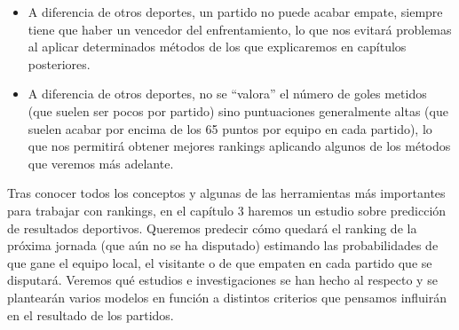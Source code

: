 \begin{itemize}
	\item A diferencia de otros deportes, un partido no puede acabar empate, siempre tiene que haber un vencedor del enfrentamiento, lo que nos evitará problemas al aplicar determinados métodos de los que explicaremos en capítulos posteriores. 
	\item A diferencia de otros deportes, no se ``valora'' el número de goles metidos (que suelen ser pocos por partido) sino puntuaciones generalmente altas (que suelen acabar por encima de los 65 puntos por equipo en cada partido), lo que nos permitirá obtener mejores rankings aplicando algunos de los métodos que veremos más adelante. 
\end{itemize}

Tras conocer todos los conceptos y algunas de las herramientas más importantes para trabajar con rankings, en el capítulo 3 haremos un estudio sobre predicción de resultados deportivos. Queremos predecir cómo quedará el ranking de la próxima jornada (que aún no se ha disputado) estimando las probabilidades de que gane el equipo local, el visitante o de que empaten en cada partido que se disputará. Veremos qué estudios e investigaciones se han hecho al respecto y se plantearán varios modelos en función a distintos criterios que pensamos influirán en el resultado de los partidos.